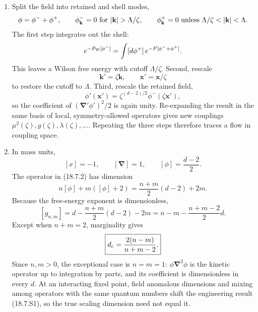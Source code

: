 \begin{enumerate}
  \begin{enumerate}
    \item[(a)]
    Split the field into retained and shell modes,
    \[
      \phi=\phi^-+\phi^+,\qquad
      \phi^-_{\mathbf k}=0\ \hbox{for }|\mathbf k|>\Lambda/\zeta,
      \qquad
      \phi^+_{\mathbf k}=0\ \hbox{unless }
        \Lambda/\zeta<|\mathbf k|<\Lambda .
    \]
    The first step integrates out the shell:
    \[
      e^{-F_{\rm W}[\phi^-]}
        =\int[d\phi^+]\,e^{-F[\phi^-+\phi^+]}.
    \]
    This leaves a Wilson free energy with cutoff \(\Lambda/\zeta\).
    Second, rescale
    \[
      \mathbf k'=\zeta\mathbf k,\qquad
      \mathbf x'=\mathbf x/\zeta
    \]
    to restore the cutoff to \(\Lambda\).  Third, rescale the retained
    field,
    \[
      \phi'(\mathbf x')
        =\zeta^{(d-2)/2}\phi^-(\zeta\mathbf x'),
    \]
    so the coefficient of \((\boldsymbol\nabla'\phi')^2/2\) is again
    unity.  Re-expanding the result in the same basis of local,
    symmetry-allowed operators gives new couplings
    \(\mu^2(\zeta),g(\zeta),\lambda(\zeta),\ldots\).  Repeating the three
    steps therefore traces a flow in coupling space.

    \item[(b)]
    In mass units,
    \[
      [x]=-1,\qquad[\boldsymbol\nabla]=1,\qquad
      [\phi]=\frac{d-2}{2}.
    \]
    The operator in (18.7.2) has dimension
    \[
      n[\phi]+m([\phi]+2)
        =\frac{n+m}{2}(d-2)+2m.
    \]
    Because the free-energy exponent is dimensionless,
    \[
      \boxed{[g_{n,m}]
        =d-\frac{n+m}{2}(d-2)-2m
        =n-m-\frac{n+m-2}{2}d.}
      \tag{18.7.S1}
    \]
    Except when \(n+m=2\), marginality gives
    \[
      \boxed{d_{\rm c}=\frac{2(n-m)}{n+m-2}.}
    \]
    Since \(n,m>0\), the exceptional case is \(n=m=1\):
    \(\phi\boldsymbol\nabla^2\phi\) is the kinetic operator up to
    integration by parts, and its coefficient is dimensionless in every
    \(d\).  At an interacting fixed point, field anomalous dimensions and
    mixing among operators with the same quantum numbers shift the
    engineering result (18.7.S1), so the true scaling dimension need not
    equal it.


\end{enumerate}
\end{enumerate}
